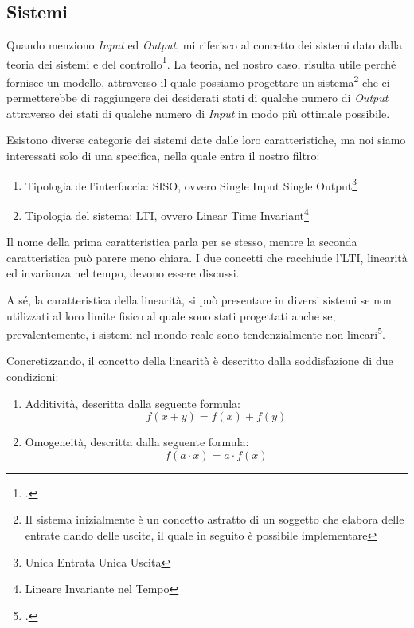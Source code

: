 \documentclass[a4paper, 10pt, final]{article} %
\begin{document}
    \subsection{Sistemi}\label{sec:FilterTheorySystems}
    Quando menziono \emph{Input} ed \emph{Output}, mi riferisco al concetto dei sistemi dato dalla teoria dei sistemi e del controllo\footcite[]{ControlTheory:Wiki}.
    La teoria, nel nostro caso, risulta utile perch\'{e} fornisce un modello, attraverso il quale possiamo progettare un sistema\footnote{Il sistema inizialmente \`{e} un concetto astratto di un soggetto che elabora delle entrate dando delle uscite, il quale in seguito \`{e} possibile implementare} che ci permetterebbe di raggiungere dei desiderati stati di qualche numero di \emph{Output} attraverso dei stati di qualche numero di \emph{Input} in modo pi\`{u} ottimale possibile.

    \begin{samepage}
        \noindent Esistono diverse categorie dei sistemi date dalle loro caratteristiche, ma noi siamo interessati solo di una specifica, nella quale entra il nostro filtro:
        \begin{enumerate}[label=\emph{(\arabic*)}]
            \item Tipologia dell'interfaccia: SISO, ovvero Single Input Single Output\footnote{Unica Entrata Unica Uscita}
            \item Tipologia del sistema: LTI, ovvero Linear Time Invariant\footnote{Lineare Invariante nel Tempo}
        \end{enumerate}
    \end{samepage}
    Il nome della prima caratteristica parla per se stesso, mentre la seconda caratteristica pu\`{o} parere meno chiara.
    I due concetti che racchiude l'LTI, linearit\`{a} ed invarianza nel tempo, devono essere discussi.

    A s\'{e}, la caratteristica della linearit\`{a}, si pu\`{o} presentare in diversi sistemi se non utilizzati al loro limite fisico al quale sono stati progettati anche se, prevalentemente, i sistemi nel mondo reale sono tendenzialmente non-lineari\footcite[]{TransferFunction:Wiki}.
    \begin{samepage}
        \noindent Concretizzando, il concetto della linearit\`{a} \`{e} descritto dalla soddisfazione di due condizioni:
        \begin{enumerate}[label=\emph{(\arabic*)}]
            \item Additivit\`{a}, descritta dalla seguente formula: \[f(x + y) = f(x) + f(y)\]
            \item Omogeneit\`{a}, descritta dalla seguente formula: \[f(a \cdot x) = a \cdot f(x)\]
        \end{enumerate}
    \end{samepage}
\end{document}
